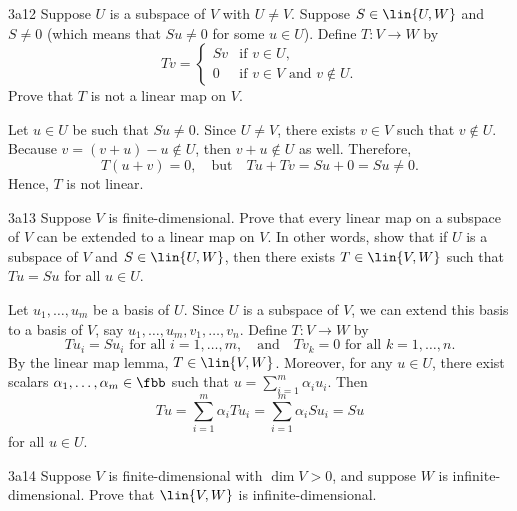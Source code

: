 \begin{exercise}{3a12}
    Suppose $U$ is a subspace of $V$ with $U \neq V$.
	Suppose $S \in \lin{U, W}$ and $S \neq 0$ (which means that $Su \neq 0$ for some $u \in U$).
	Define $T: V \to W$ by
    \[
        Tv = 
        \begin{cases}
            Sv & \text{if } v \in U, \\
            0 & \text{if } v \in V \text{ and } v \notin U. 
        \end{cases}
    \]
    Prove that $T$ is not a linear map on $V$.
\end{exercise}

\begin{sol}
    Let $u \in U$ be such that $Su \neq 0$.
    Since $U \neq V$, there exists $v \in V$ such that $v \notin U$.
	Because $v = (v + u) - u \notin U$, then $v + u \notin U$ as well.
    Therefore,
    \[
        T(u + v) = 0, \quad \text{but} \quad Tu + Tv = Su + 0 = Su \neq 0.
    \]
    Hence, $T$ is not linear.
\end{sol}

\begin{exercise}{3a13}
    Suppose $V$ is finite-dimensional.
	Prove that every linear map on a subspace of $V$ can be extended to a linear map on $V$.
	In other words, show that if $U$ is a subspace of $V$ and $S \in \lin{U, W}$, then there exists $T \in \lin{V, W}$ such that $Tu = Su$ for all $u \in U$.
\end{exercise}

\begin{sol}
    Let $u_1, \ldots, u_m$ be a basis of $U$.
	Since $U$ is a subspace of $V$, we can extend this basis to a basis of $V$, say $u_1, \ldots, u_m, v_1, \ldots, v_n$.
	Define $T: V \to W$ by
    \[
    	Tu_i = Su_i \text{ for all } i = 1, \ldots, m, \quad \text{and} \quad Tv_k = 0 \text{ for all } k = 1, \ldots, n.
    \]
    By the linear map lemma, $T \in \lin{V, W}$.
    Moreover, for any $u \in U$, there exist scalars $\alpha_1, \ldots, \alpha_m \in \fbb$ such that $u = \sum_{i=1}^{m} \alpha_i u_i$.
    Then
    \[
        Tu = \sum_{i=1}^{m} \alpha_i Tu_i = \sum_{i=1}^{m} \alpha_i Su_i = Su
    \]
    for all $u \in U$.
\end{sol}

\begin{exercise}{3a14}
    Suppose $V$ is finite-dimensional with $\dim V > 0$, and suppose $W$ is infinite-dimensional.
	Prove that $\lin{V, W}$ is infinite-dimensional.
\end{exercise}


